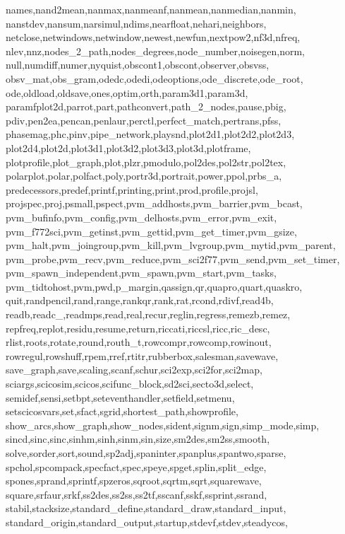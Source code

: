 {{      names,nand2mean,nanmax,nanmeanf,nanmean,nanmedian,nanmin,%
      nanstdev,nansum,narsimul,ndims,nearfloat,nehari,neighbors,%
      netclose,netwindows,netwindow,newest,newfun,nextpow2,nf3d,nfreq,%
      nlev,nnz,nodes_2_path,nodes_degrees,node_number,noisegen,norm,%
      null,numdiff,numer,nyquist,obscont1,obscont,observer,obsvss,%
      obsv_mat,obs_gram,odedc,odedi,odeoptions,ode_discrete,ode_root,%
      ode,oldload,oldsave,ones,optim,orth,param3d1,param3d,%
      paramfplot2d,parrot,part,pathconvert,path_2_nodes,pause,pbig,%
      pdiv,pen2ea,pencan,penlaur,perctl,perfect_match,pertrans,pfss,%
      phasemag,phc,pinv,pipe_network,playsnd,plot2d1,plot2d2,plot2d3,%
      plot2d4,plot2d,plot3d1,plot3d2,plot3d3,plot3d,plotframe,%
      plotprofile,plot_graph,plot,plzr,pmodulo,pol2des,pol2str,pol2tex,%
      polarplot,polar,polfact,poly,portr3d,portrait,power,ppol,prbs_a,%
      predecessors,predef,printf,printing,print,prod,profile,projsl,%
      projspec,proj,psmall,pspect,pvm_addhosts,pvm_barrier,pvm_bcast,%
      pvm_bufinfo,pvm_config,pvm_delhosts,pvm_error,pvm_exit,%
      pvm_f772sci,pvm_getinst,pvm_gettid,pvm_get_timer,pvm_gsize,%
      pvm_halt,pvm_joingroup,pvm_kill,pvm_lvgroup,pvm_mytid,pvm_parent,%
      pvm_probe,pvm_recv,pvm_reduce,pvm_sci2f77,pvm_send,pvm_set_timer,%
      pvm_spawn_independent,pvm_spawn,pvm_start,pvm_tasks,%
      pvm_tidtohost,pvm,pwd,p_margin,qassign,qr,quapro,quart,quaskro,%
      quit,randpencil,rand,range,rankqr,rank,rat,rcond,rdivf,read4b,%
      readb,readc_,readmps,read,real,recur,reglin,regress,remezb,remez,%
      repfreq,replot,residu,resume,return,riccati,riccsl,ricc,ric_desc,%
      rlist,roots,rotate,round,routh_t,rowcompr,rowcomp,rowinout,%
      rowregul,rowshuff,rpem,rref,rtitr,rubberbox,salesman,savewave,%
      save_graph,save,scaling,scanf,schur,sci2exp,sci2for,sci2map,%
      sciargs,scicosim,scicos,scifunc_block,sd2sci,secto3d,select,%
      semidef,sensi,setbpt,seteventhandler,setfield,setmenu,%
      setscicosvars,set,sfact,sgrid,shortest_path,showprofile,%
      show_arcs,show_graph,show_nodes,sident,signm,sign,simp_mode,simp,%
      sincd,sinc,sinc,sinhm,sinh,sinm,sin,size,sm2des,sm2ss,smooth,%
      solve,sorder,sort,sound,sp2adj,spaninter,spanplus,spantwo,sparse,%
      spchol,spcompack,specfact,spec,speye,spget,splin,split_edge,%
      spones,sprand,sprintf,spzeros,sqroot,sqrtm,sqrt,squarewave,%
      square,srfaur,srkf,ss2des,ss2ss,ss2tf,sscanf,sskf,ssprint,ssrand,%
      stabil,stacksize,standard_define,standard_draw,standard_input,%
      standard_origin,standard_output,startup,stdevf,stdev,steadycos,%
}}
